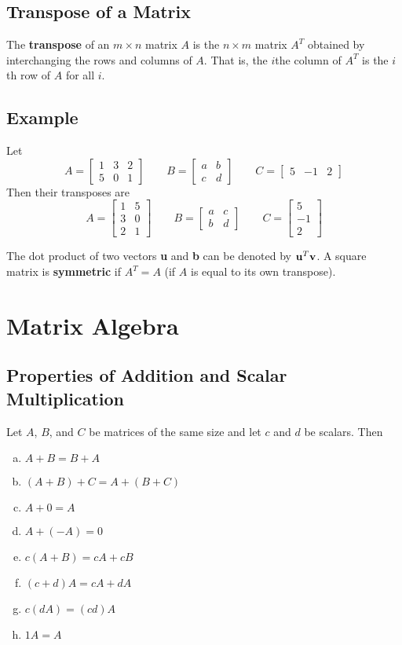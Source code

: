\subsection*{Transpose of a Matrix}
The \textbf{transpose} of an $m\times n$ matrix $A$ is the $n\times m$ matrix $A^T$
obtained by interchanging the rows and columns of $A$. That is, the $i$the column of
$A^T$ is the $i$th row of $A$ for all $i$.

\subsection*{Example}
Let
\[
    A=\begin{bmatrix}
        1 & 3 & 2 \\
        5 & 0 & 1
    \end{bmatrix} \qquad
    B=\begin{bmatrix}
        a & b \\
        c & d
    \end{bmatrix} \qquad
    C=\begin{bmatrix}
        5 & -1 & 2
    \end{bmatrix}
\]
Then their transposes are
\[
    A=\begin{bmatrix}
        1 & 5 \\
        3 & 0 \\
        2 & 1
    \end{bmatrix} \qquad
    B=\begin{bmatrix}
        a & c \\
        b & d
    \end{bmatrix} \qquad
    C=\begin{bmatrix}
        5 \\ -1 \\ 2
    \end{bmatrix}
\]

The dot product of two vectors \textbf{u} and \textbf{b} can be denoted by $\mathbf{u}^T\mathbf{v}$.
A square matrix is \textbf{symmetric} if $A^T=A$ (if $A$ is equal to its own transpose).

\section{Matrix Algebra}

\subsection*{Properties of Addition and Scalar Multiplication}
Let $A$, $B$, and $C$ be matrices of the same size and let $c$ and $d$ be scalars. Then
\begin{enumerate}[(a)]
    \item $A+B=B+A$
    \item $(A+B)+C=A+(B+C)$
    \item $A+0=A$
    \item $A+(-A)=0$
    \item $c(A+B)=cA+cB$
    \item $(c+d)A=cA+dA$
    \item $c(dA)=(cd)A$
    \item $1A=A$
\end{enumerate}

